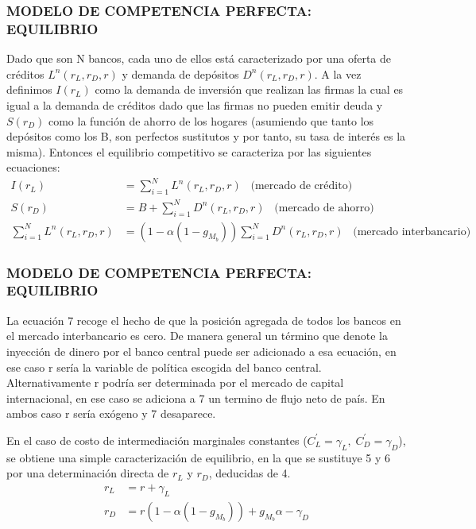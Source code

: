 \documentclass[10pt, xcolor=table, x11names]{beamer}
\begin{document}
\begin{frame}
    \frametitle{{\normalsize MODELO DE COMPETENCIA PERFECTA: EQUILIBRIO} {}}
    Dado que son N bancos, cada uno de ellos está caracterizado por una oferta de créditos $L^{n}(r_{L}, r_{D}, r)$ y demanda de depósitos $D^{n}(r_{L}, r_{D}, r)$. A la vez  definimos $I(r_{L})$ como la demanda de inversión que realizan las firmas la cual es igual a la demanda de créditos dado que las firmas no pueden emitir deuda y $S(r_{D}) $ como la función de ahorro de los hogares (asumiendo que tanto los depósitos como los B, son perfectos sustitutos y por tanto, su tasa de interés es la misma). Entonces el equilibrio competitivo se caracteriza por las siguientes ecuaciones:
     \begin{align}
     I(r_{L})&=\sum_{i=1}^{N}L^{n}(r_{L}, r_{D}, r) \;\;\; \mbox{(mercado de crédito)}\\
     S(r_{D})&=B+\sum_{i=1}^{N}D^{n}(r_{L}, r_{D}, r) \;\;\; \mbox{(mercado de ahorro)}\\
     \sum_{i=1}^{N}L^{n}(r_{L}, r_{D}, r)&=(1-\alpha(1-g_{M_{b}}))\sum_{i=1}^{N}D^{n}(r_{L}, r_{D}, r) \;\;\; \mbox{(mercado interbancario)}
     \end{align} 
    
    
    
\end{frame}



\begin{frame}
    \frametitle{{\normalsize MODELO DE COMPETENCIA PERFECTA: EQUILIBRIO} {}}
   La ecuación 7 recoge el hecho de que la posición agregada de todos los bancos en el mercado interbancario es cero. De manera general un término que denote la inyección de dinero por el banco central puede ser adicionado a esa ecuación, en ese caso r sería la variable de política escogida del banco central. Alternativamente r podría ser determinada por el mercado de capital internacional, en ese caso se adiciona a 7 un termino de flujo neto de país. En ambos caso r sería exógeno y 7 desaparece.
   
   En el caso de costo de intermediación  marginales constantes ($C_{L}^{'}=\gamma_{L},\; C_{D}^{'}=\gamma_{D} $),  se obtiene una simple caracterización de equilibrio, en la que se sustituye 5 y 6 por una determinación directa de $r_{L}$ y $r_{D}$, deducidas de 4.
   \begin{align}
   r_{L}&=r+\gamma_{L} \\
   r_{D}&=r(1-\alpha(1-g_{M_{b}}))+g_{M_{b}}\alpha-\gamma_{D} 
   \end{align} 
    
\end{frame}
\end{document}
